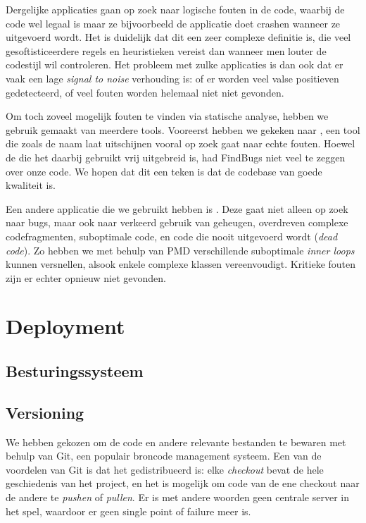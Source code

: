 Dergelijke applicaties gaan op zoek naar logische fouten in de code, waarbij de code wel legaal is maar ze bijvoorbeeld de applicatie doet crashen wanneer ze uitgevoerd wordt. Het is duidelijk dat dit een zeer complexe definitie is, die veel gesoftisticeerdere regels en heuristieken vereist dan wanneer men louter de codestijl wil controleren. Het probleem met zulke applicaties is dan ook dat er vaak een lage \emph{signal to noise} verhouding is: of er worden veel valse positieven gedetecteerd, of veel fouten worden helemaal niet niet gevonden.

Om toch zoveel mogelijk fouten te vinden via statische analyse, hebben we gebruik gemaakt van meerdere tools. Vooreerst hebben we gekeken naar , een tool die zoals de naam laat uitschijnen vooral op zoek gaat naar echte fouten. Hoewel de  die het daarbij gebruikt vrij uitgebreid is, had FindBugs niet veel te zeggen over onze code. We hopen dat dit een teken is dat de codebase van goede kwaliteit is.

Een andere applicatie die we gebruikt hebben is . Deze gaat niet alleen op zoek naar bugs, maar ook naar verkeerd gebruik van geheugen, overdreven complexe codefragmenten, suboptimale code, en code die nooit uitgevoerd wordt (\emph{dead code}). Zo hebben we met behulp van PMD verschillende suboptimale \emph{inner loops} kunnen versnellen, alsook enkele complexe klassen vereenvoudigt. Kritieke fouten zijn er echter opnieuw niet gevonden.

\chapter{Deployment}

\section{Besturingssysteem}


\section{Versioning}
\label{server:deployment:versioning}

We hebben gekozen om de code en andere relevante bestanden te bewaren met behulp van Git, een populair broncode management systeem. Een van de voordelen van Git is dat het gedistribueerd is: elke \emph{checkout} bevat de hele geschiedenis van het project, en het is mogelijk om code van de ene checkout naar de andere te \emph{pushen} of \emph{pullen}. Er is met andere woorden geen centrale server in het spel, waardoor er geen single point of failure meer is.

